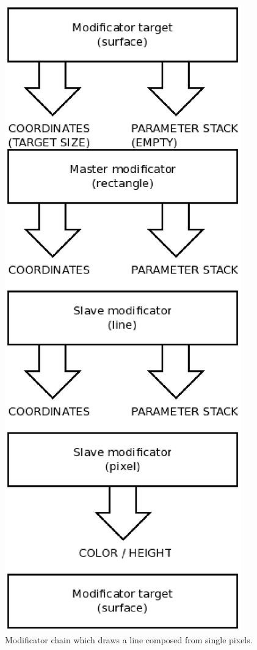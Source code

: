 \documentclass[9pt]{article}
\begin{document}
\begin{figure}[h]
\begin{center}
  \includegraphics[scale=0.6]{p08.eps}
  \caption{Modificator chain which draws a line composed from single pixels.}
  \label{rect_line_example}
\end{center}
\end{figure}
\end{document}
